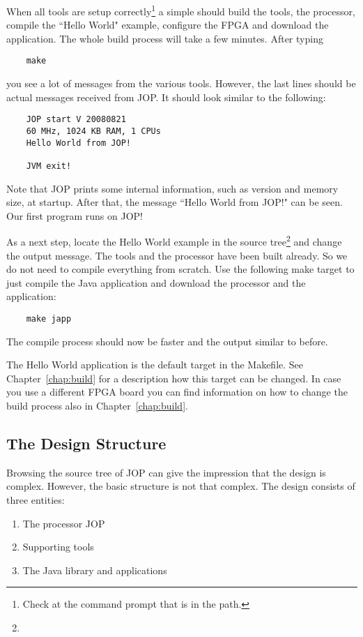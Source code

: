 When all tools are setup correctly\footnote{Check at the command
prompt that  is in the path.} a simple  should
build the tools, the processor, compile the ``Hello World" example,
configure the FPGA and download the application. The whole build
process will take a few minutes. After typing
\begin{verbatim}
    make
\end{verbatim}
you see a lot of messages from the various tools. However, the last
lines should be actual messages received from JOP. It should look
similar to the following:
\begin{verbatim}
    JOP start V 20080821
    60 MHz, 1024 KB RAM, 1 CPUs
    Hello World from JOP!

    JVM exit!
\end{verbatim}
Note that JOP prints some internal information, such as version and
memory size, at startup. After that, the message ``Hello World from
JOP!" can be seen. Our first program runs on JOP!

As a next step, locate the Hello World example in the source
tree\footnote{}
and change the output message. The tools and the processor have been
built already. So we do not need to compile everything from scratch.
Use the following make target to just compile the Java application
and download the processor and the application:
\begin{verbatim}
    make japp
\end{verbatim}
The compile process should now be faster and the output similar to
before.

The Hello World application is the default target in the Makefile.
See Chapter~\ref{chap:build} for a description how this target can be
changed. In case you use a different FPGA board you can find
information on how to change the build process also in
Chapter~\ref{chap:build}.

\subsection{The Design Structure}

Browsing the source tree of JOP can give the impression that the
design is complex. However, the basic structure is not that complex.
The design consists of three entities:
\begin{enumerate}
    \item The processor JOP
    \item Supporting tools
    \item The Java library and applications
\end{enumerate}

